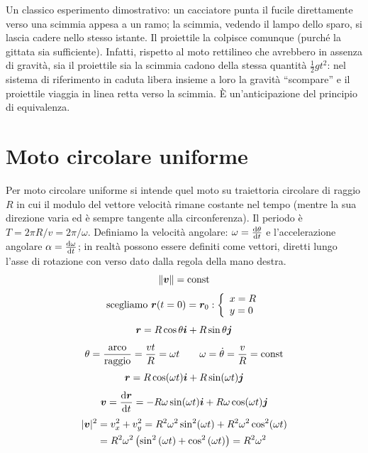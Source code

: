 \begin{Es}
  Un classico esperimento dimostrativo: un cacciatore punta il fucile direttamente verso una scimmia appesa a un ramo; la scimmia, vedendo il lampo dello sparo, si lascia cadere nello stesso istante. Il proiettile la colpisce comunque (purché la gittata sia sufficiente). Infatti, rispetto al moto rettilineo che avrebbero in assenza di gravità, sia il proiettile sia la scimmia cadono della stessa quantità $\frac{1}{2}gt^2$: nel sistema di riferimento in caduta libera insieme a loro la gravità ``scompare'' e il proiettile viaggia in linea retta verso la scimmia. È un'anticipazione del principio di equivalenza.
\end{Es}

\section{Moto circolare uniforme}
Per moto circolare uniforme si intende quel moto su traiettoria
circolare di raggio $R$ in cui il modulo del vettore velocità rimane costante
nel tempo (mentre la sua direzione varia ed è sempre tangente
alla circonferenza). Il periodo è $T=2\pi R/v=2\pi/\omega$. Definiamo la velocità angolare: $\omega=\frac{\mathrm{d}\theta}{\mathrm{d} t}$ e l'accelerazione angolare $\alpha=\frac{\mathrm{d} \omega}{\mathrm{d} t}$; in realtà possono essere definiti come vettori, diretti lungo l'asse di rotazione con verso dato dalla regola della mano destra.
\[\left\lVert\boldsymbol{v}\right\rVert=\text{const}\]
\[\text{scegliamo $\boldsymbol{r}(t=0)=\boldsymbol{r}_0$}:\left\{
  \begin{array}{l}
    x=R \\
    y=0 \\
  \end{array}\right.\]
\[\boldsymbol{r}=R\cos\theta\boldsymbol{i}+R\sin\theta\boldsymbol{j}\]
\[\theta=\frac{\text{arco}}{\text{raggio}}=\frac{vt}{R}=\omega t\qquad\omega=\dot\theta=\frac{v}{R}=\text{const}\]
\[\boldsymbol{r}=R\cos(\omega t)\boldsymbol{i}+R\sin(\omega t)\boldsymbol{j}\]
\[\boldsymbol{v}=\frac{\mathrm{d} \boldsymbol{r}}{\mathrm{d} t}=-R\omega\sin(\omega t)\boldsymbol{i}+R\omega\cos(\omega t)\boldsymbol{j}\]
\begin{align*}|\boldsymbol{v}|^2 & =v_x^2+v_y^2=R^2\omega^2\sin^2(\omega
              t)+R^2\omega^2\cos^2(\omega t)                                               \\
                        & =R^2\omega^2\left(\sin^2\left(\omega t\right)+\cos^2\left(\omega
              t\right)\right)=R^2\omega^2
\end{align*}

